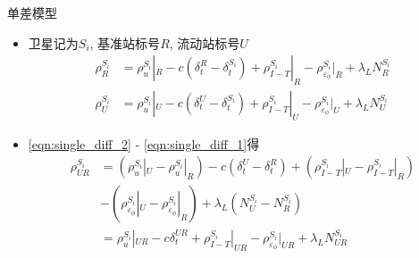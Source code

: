 \begin{frame}{单差模型}
    \begin{itemize}
        \item 卫星记为$S _ i$, 基准站标号$R$, 流动站标号$U$
        \begin{align}
            \rho _ R ^ { S _ i } &= \rho _ u ^ { S _ i } | _ R 
            - c \left( \delta _ t ^ R - \delta _ t ^ { S _ i } \right)
            + \rho _ { I - T } ^ { S _ i } | _ R
            - \rho _ { \varepsilon _ \phi } ^ { S _ i } | _ R
            + \lambda _ L N _ R ^ { S _ i } \label{eqn:single_diff_1} \\
            \rho _ U ^ { S _ i } &= \rho _ u ^ { S _ i } | _ U 
            - c \left( \delta _ t ^ U - \delta _ t ^ { S _ i } \right)
            + \rho _ { I - T } ^ { S _ i } | _ U
            - \rho _ { \varepsilon _ \phi } ^ { S _ i } | _ U
            + \lambda _ L N _ U ^ { S _ i } \label{eqn:single_diff_2}
        \end{align}
        \item \eqref{eqn:single_diff_2} - \eqref{eqn:single_diff_1}得
        \begin{align*}
            \rho _ { UR } ^ { S _ i } &= \left( \rho _ u ^ { S _ i } | _ U 
            - \rho _ u ^ { S _ i } | _ R \right)
            - c \left( \delta _ t ^ U - \delta _ t ^ R \right)
            + \left( \rho _ { I - T } ^ { S _ i } | _ U - \rho _ { I - T } ^ { S _ i } | _ R \right) \\
            &- \left( \rho _ { \varepsilon _ \phi } ^ { S _ i } | _ U - 
            \rho _ { \varepsilon _ \phi } ^ { S _ i } | _ R \right)
            + \lambda _ L \left( N _ U ^ { S _ i } - N _ R ^ { S _ i } \right) \\
            &= \rho _ u ^ { S _ i } | _ { U R } - c \delta _ t ^ { UR }
            + \rho _ { I - T } ^ { S _ i } | _ { UR } 
            - \rho _ { \varepsilon _ \phi } ^ { S _ i } | _ { UR }
            + \lambda _ L N _ { UR } ^ { S _ i }
        \end{align*}
    \end{itemize}
\end{frame}


